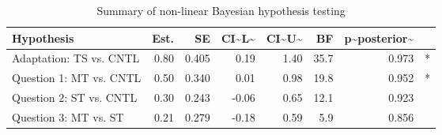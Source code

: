 \begin{table}

\caption{\label{tab:unnamed-chunk-27}Summary of non-linear Bayesian hypothesis testing}
\centering
\begin{tabular}[t]{l|r|r|r|r|r|r|l}
\hline
Hypothesis & Est. & SE & CI\textasciitilde{}L\textasciitilde{} & CI\textasciitilde{}U\textasciitilde{} & BF & p\textasciitilde{}posterior\textasciitilde{} & \\
\hline
Adaptation: TS vs. CNTL & 0.80 & 0.405 & 0.19 & 1.40 & 35.7 & 0.973 & *\\
\hline
Question 1: MT vs. CNTL & 0.50 & 0.340 & 0.01 & 0.98 & 19.8 & 0.952 & *\\
\hline
Question 2: ST vs. CNTL & 0.30 & 0.243 & -0.06 & 0.65 & 12.1 & 0.923 & \\
\hline
Question 3: MT vs. ST & 0.21 & 0.279 & -0.18 & 0.59 & 5.9 & 0.856 & \\
\hline
\end{tabular}
\end{table}
